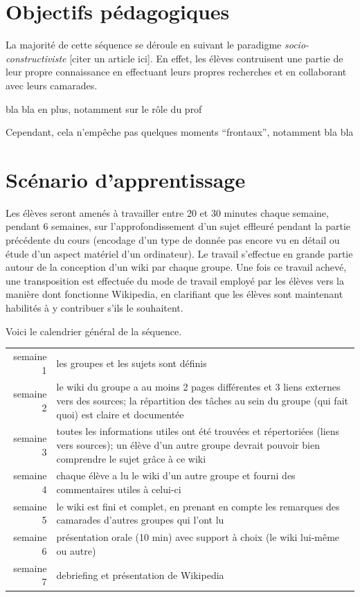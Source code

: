 \documentclass[11pt,bibliography=totoc]{scrartcl}
\begin{document}
\section{Objectifs pédagogiques}
La majorité de cette séquence se déroule en suivant le paradigme
\textit{socio-constructiviste} [citer un article ici]. En effet, les élèves
contruisent une partie de leur propre connaissance en effectuant leurs propres
recherches et en collaborant avec leurs camarades.

bla bla en plus, notamment sur le rôle du prof

Cependant, cela n'empêche pas quelques moments ``frontaux'', notamment bla bla 

\section{Scénario d'apprentissage}
Les élèves seront amenés à travailler entre 20 et 30 minutes chaque semaine,
pendant 6 semaines, sur l'approfondissement d'un sujet effleuré pendant la
partie précédente du cours (encodage d'un type de donnée pas encore vu en détail
ou étude d'un aspect matériel d'un ordinateur). Le travail s'effectue en grande
partie autour de la conception d'un wiki par chaque groupe. Une fois ce travail
achevé, une transposition est effectuée du mode de travail employé par les
élèves vers la manière dont fonctionne Wikipedia, en clarifiant que les élèves
sont maintenant habilités à y contribuer s'ils le souhaitent.

Voici le calendrier général de la séquence.
\begin{center}
\begin{tabular}{rp{}}
  semaine 1& les groupes et les sujets sont définis\\
  semaine 2& le wiki du groupe a au moins 2 pages différentes et 3 liens
              externes vers des sources;
              la répartition des tâches au sein du groupe (qui fait quoi) est claire et documentée\\
  semaine 3& toutes les informations utiles ont été trouvées et répertoriées
              (liens vers sources);
              un élève d'un autre groupe devrait pouvoir bien comprendre le sujet grâce à ce wiki\\
  semaine 4& chaque élève a lu le wiki d'un autre groupe et fourni des commentaires utiles à celui-ci\\
  semaine 5& le wiki est fini et complet, en prenant en compte les remarques des
             camarades d'autres groupes qui l'ont lu\\
  semaine 6& présentation orale (10 min) avec support à choix (le wiki lui-même
             ou autre)\\
  semaine 7& debriefing et présentation de Wikipedia
\end{tabular}  
\end{center}
\end{document}
